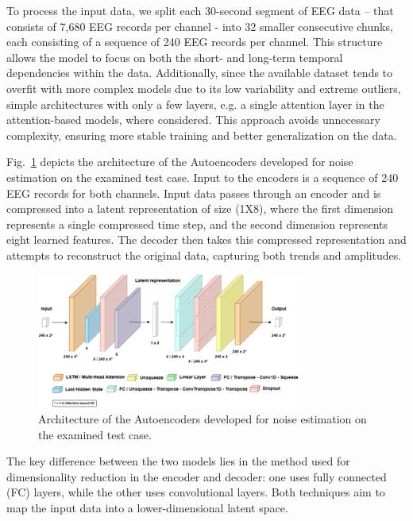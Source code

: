 \documentclass[conference]{IEEEtran}
\begin{document}
To process the input data, we split each 30-second segment of EEG data – that consists of 7,680 EEG records per channel - into 32 smaller consecutive chunks, each consisting of a sequence of 240 EEG records per channel. This structure allows the model to focus on both the short- and long-term temporal dependencies within the data. Additionally, since the available dataset tends to overfit with more complex models due to its low variability and extreme outliers, simple architectures with only a few layers, e.g. a single attention layer in the attention-based models, where considered. This approach avoids unnecessary complexity, ensuring more stable training and better generalization on the data.

Fig.~\ref{fig:Fig2} depicts the architecture of the Autoencoders developed for noise estimation on the examined test case. Input to the encoders is a sequence of 240 EEG records for both channels. Input data passes through an encoder and is compressed into a latent representation of size (1X8), where the first dimension represents a single compressed time step, and the second dimension represents eight learned features. The decoder then takes this compressed representation and attempts to reconstruct the original data, capturing both trends and amplitudes. 


\begin{figure}
    \centering
    \includegraphics[width=0.95\columnwidth]{images/Fig2.png}     
    \vspace{-0.1in}
    \caption{\label{fig:Fig2} Architecture of the Autoencoders developed for noise estimation on the examined test case.}
\end{figure}

The key difference between the two models lies in the method used for dimensionality reduction in the encoder and decoder: one uses fully connected (FC) layers, while the other uses convolutional layers. Both techniques aim to map the input data into a lower-dimensional latent space.
\end{document}
